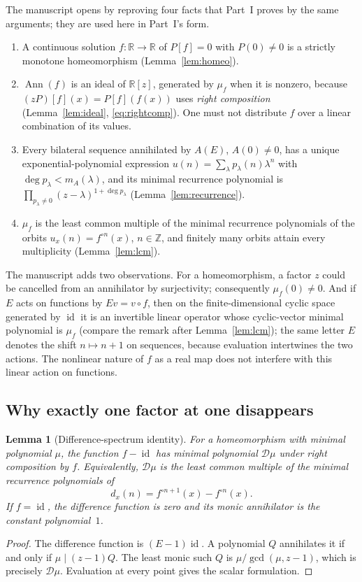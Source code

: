 \documentclass[11pt,letterpaper]{article}
\newtheorem{lemma}[theorem]{Lemma}
\theoremstyle{definition}
\theoremstyle{remark}
\newcommand{\R}{\mathbb R}
\newcommand{\Z}{\mathbb Z}
\newcommand{\id}{\operatorname{id}}
\newcommand{\itn}[2]{#1^{\circ #2}}
\newcommand{\Ann}{\operatorname{Ann}}
\newcommand{\scD}{\mathcal D}
\begin{document}
The manuscript opens by reproving four facts that Part~I proves by the same
arguments; they are used here in Part~I's form.
\begin{enumerate}[label=\textnormal{(\arabic*)},leftmargin=2.2em]
\item A continuous solution $f:\R\to\R$ of $P[f]=0$ with $P(0)\ne0$ is a
strictly monotone homeomorphism (Lemma~\ref{lem:homeo}).
\item $\Ann(f)$ is an ideal of $\R[z]$, generated by $\mu_f$ when it is
nonzero, because $(zP)[f](x)=P[f](f(x))$ uses \emph{right composition}
(Lemma~\ref{lem:ideal}, \eqref{eq:rightcomp}). One must not distribute $f$
over a linear combination of its values.
\item Every bilateral sequence annihilated by $A(E)$, $A(0)\ne0$, has a unique
exponential-polynomial expression $u(n)=\sum_\lambda p_\lambda(n)\lambda^n$
with $\deg p_\lambda<m_A(\lambda)$, and its minimal recurrence polynomial is
$\prod_{p_\lambda\ne0}(z-\lambda)^{1+\deg p_\lambda}$
(Lemma~\ref{lem:recurrence}).
\item $\mu_f$ is the least common multiple of the minimal recurrence
polynomials of the orbits $u_x(n)=\itn{f}{n}(x)$, $n\in\Z$, and finitely many
orbits attain every multiplicity (Lemma~\ref{lem:lcm}).
\end{enumerate}
The manuscript adds two observations. For a homeomorphism, a factor $z$ could
be cancelled from an annihilator by surjectivity; consequently
$\mu_f(0)\ne0$. And if $E$ acts on functions by $Ev=v\circ f$, then on the
finite-dimensional cyclic space generated by $\id$ it is an invertible linear
operator whose cyclic-vector minimal polynomial is $\mu_f$ (compare the remark
after Lemma~\ref{lem:lcm}); the same letter $E$ denotes the shift
$n\mapsto n+1$ on sequences, because evaluation intertwines the two actions.
The nonlinear nature of $f$ as a real map does not interfere with this linear
action on functions.

\subsection{Why exactly one factor at one disappears}

\begin{lemma}[Difference-spectrum identity]
\label{nrr:sc:lem:difference}
For a homeomorphism with minimal polynomial $\mu$, the function
$f-\id$ has minimal polynomial $\scD\mu$ under right composition by $f$.
Equivalently, $\scD\mu$ is the least common multiple of the minimal
recurrence polynomials of
\begin{equation}
 d_x(n)=\itn{f}{n+1}(x)-\itn{f}{n}(x).
 \label{nrr:sc:eq:increments}
\end{equation}
If $f=\id$, the difference function is zero and its monic annihilator
is the constant polynomial~$1$.
\end{lemma}
\begin{proof}
The difference function is $(E-1)\id$. A polynomial $Q$ annihilates it
if and only if $\mu\mid(z-1)Q$. The least monic such $Q$ is
$\mu/\gcd(\mu,z-1)$, which is precisely $\scD\mu$.
Evaluation at every point gives the scalar formulation.
\end{proof}
\end{document}
